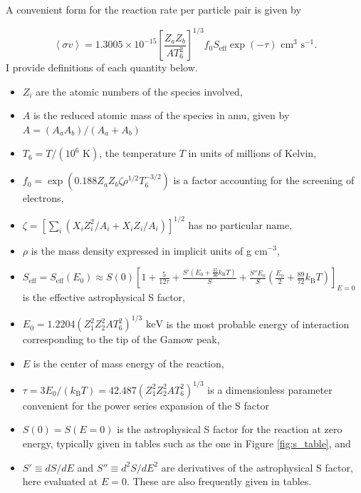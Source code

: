 \documentclass[12pt]{article}
\newcommand{\bigparenthesis}[1]{\left(#1\right)}
\begin{document}
A convenient form for the reaction rate per particle pair is given by

\begin{equation}
    \left<\sigma v\right> = 1.3005\times10^{-15} \left[ \frac{Z_a Z_b}{A T_6^2}\right]^{1/3} f_0 S_\mathrm{eff} \exp(-\tau) \text{ cm}^3 \text{ s}^{-1}.
\end{equation}
%
I provide definitions of each quantity below.

\begin{itemize}
    \item $Z_i$ are the atomic numbers of the species involved,
    \item $A$ is the reduced atomic mass of the species in amu, given by $A = (A_a A_b)/(A_a + A_b)$
    \item $T_6 = T/(10^6\text{ K})$, the temperature $T$ in units of millions of Kelvin,
    \item $f_0 = \exp\bigparenthesis{0.188Z_a Z_b \zeta \rho^{1/2} T_6^{-3/2}}$ is a factor accounting for the screening of electrons,
    \item $\zeta = \left[\sum_i (X_i Z_i^2 /A_i + X_i Z_i/A_i) \right]^{1/2}$ has no particular name,
    \item $\rho$ is the mass density expressed in implicit units of g cm$^{-3}$,
    \item $S_\mathrm{eff} = S_\mathrm{eff}(E_0) \approx S(0) \left[1 + \frac{5}{12\tau} + \frac{S' (E_0 + \frac{35}{36}k_\mathrm{B}T)}{S} + \frac{S'' E_0}{S} \left(\frac{E_0}{2} + \frac{89}{72}k_\mathrm{B}T \right) \right]_{E = 0}$ is the effective astrophysical S factor,
    \item $E_0 = 1.2204 \left(Z_1^2 Z_2^2 A T_6^2\right)^{1/3} \text{ keV}$ is the most probable energy of interaction corresponding to the tip of the Gamow peak,
    \item $E$ is the center of mass energy of the reaction,
    \item $\tau = 3E_0/(k_\mathrm{B}T) = 42.487 \left(Z_1^2 Z_2^2 A T_6^2\right)^{1/3}$ is a dimensionless parameter convenient for the power series expansion of the S factor
    \item $S(0) = S(E=0)$ is the astrophysical S factor for the reaction at zero energy, typically given in tables such as the one in Figure \ref{fig:s_table}, and
    \item $S' \equiv dS/dE$ and $S'' \equiv d^2 S/dE^2$ are derivatives of the astrophysical S factor, here evaluated at $E = 0$. These are also frequently given in tables.
\end{itemize}
\end{document}
